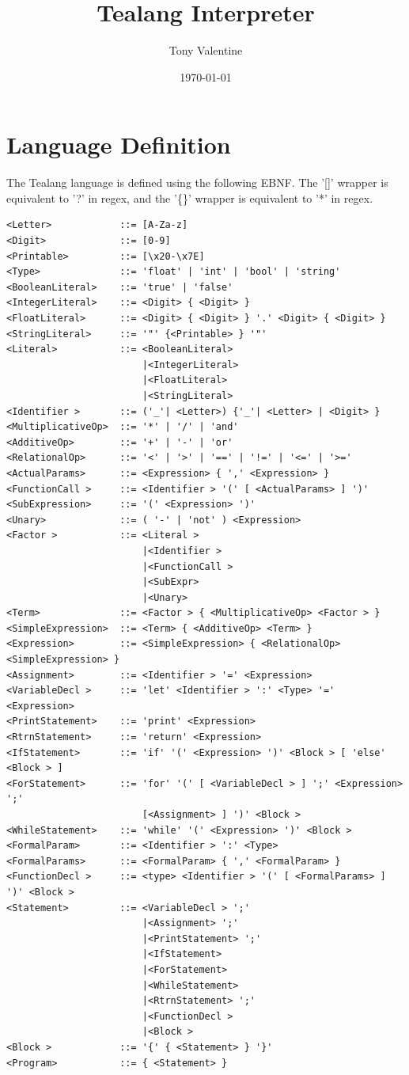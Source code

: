 \documentclass[11pt]{article}
\author{Tony Valentine}
\date{\today}
\title{Tealang Interpreter}
\begin{document}
\maketitle
\tableofcontents

\newpage
\section{Language Definition}
\label{sec:orgcd7c3fd}

The Tealang language is defined using the following EBNF. The '[]' wrapper is equivalent to '?' in regex, and the '\{\}' wrapper is equivalent to '*' in regex.

\begin{verbatim}
<Letter>            ::= [A-Za-z]
<Digit>             ::= [0-9]
<Printable>         ::= [\x20-\x7E]
<Type>              ::= 'float' | 'int' | 'bool' | 'string'
<BooleanLiteral>    ::= 'true' | 'false'
<IntegerLiteral>    ::= <Digit> { <Digit> }
<FloatLiteral>      ::= <Digit> { <Digit> } '.' <Digit> { <Digit> }
<StringLiteral>     ::= '"' {<Printable> } '"'
<Literal>           ::= <BooleanLiteral>
                        |<IntegerLiteral>
                        |<FloatLiteral>
                        |<StringLiteral>
<Identifier >       ::= ('_'| <Letter>) {'_'| <Letter> | <Digit> }
<MultiplicativeOp>  ::= '*' | '/' | 'and'
<AdditiveOp>        ::= '+' | '-' | 'or'
<RelationalOp>      ::= '<' | '>' | '==' | '!=' | '<=' | '>='
<ActualParams>      ::= <Expression> { ',' <Expression> }
<FunctionCall >     ::= <Identifier > '(' [ <ActualParams> ] ')'
<SubExpression>     ::= '(' <Expression> ')'
<Unary>             ::= ( '-' | 'not' ) <Expression>
<Factor >           ::= <Literal >
                        |<Identifier >
                        |<FunctionCall >
                        |<SubExpr>
                        |<Unary>
<Term>              ::= <Factor > { <MultiplicativeOp> <Factor > }
<SimpleExpression>  ::= <Term> { <AdditiveOp> <Term> }
<Expression>        ::= <SimpleExpression> { <RelationalOp> <SimpleExpression> }
<Assignment>        ::= <Identifier > '=' <Expression>
<VariableDecl >     ::= 'let' <Identifier > ':' <Type> '=' <Expression>
<PrintStatement>    ::= 'print' <Expression>
<RtrnStatement>     ::= 'return' <Expression>
<IfStatement>       ::= 'if' '(' <Expression> ')' <Block > [ 'else' <Block > ]
<ForStatement>      ::= 'for' '(' [ <VariableDecl > ] ';' <Expression> ';'
                        [<Assignment> ] ')' <Block >
<WhileStatement>    ::= 'while' '(' <Expression> ')' <Block >
<FormalParam>       ::= <Identifier > ':' <Type>
<FormalParams>      ::= <FormalParam> { ',' <FormalParam> }
<FunctionDecl >     ::= <type> <Identifier > '(' [ <FormalParams> ] ')' <Block >
<Statement>         ::= <VariableDecl > ';'
                        |<Assignment> ';'
                        |<PrintStatement> ';'
                        |<IfStatement>
                        |<ForStatement>
                        |<WhileStatement>
                        |<RtrnStatement> ';'
                        |<FunctionDecl >
                        |<Block >
<Block >            ::= '{' { <Statement> } '}'
<Program>           ::= { <Statement> }

\end{verbatim}
\end{document}

